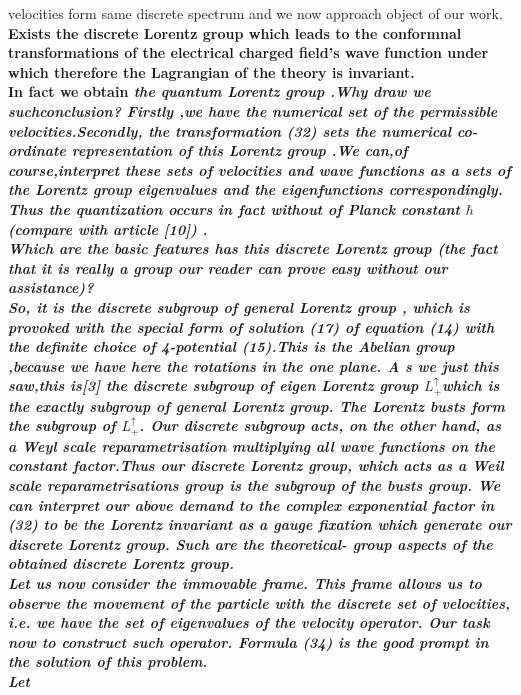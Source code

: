 \documentclass[a4paper,12pt] {article}
\begin{document}
{velocities form same discrete spectrum \rm and we now approach object of our work.\\ \bf Exists the
 discrete Lorentz group which leads to the conformnal transformations of the electrical charged field's
 wave function under which therefore the Lagrangian of the theory is invariant.
\\\rm  In fact we obtain \it the quantum Lorentz group .\rm Why draw we suchconclusion? Firstly ,we
 have the numerical set of the permissible velocities.Secondly, the transformation (32) sets
 \it the numerical co-ordinate representation of this Lorentz group  .\rm We can,of course,interpret these
sets of velocities and wave functions  \it as a sets of the Lorentz group  eigenvalues  and the
eigenfunctions  correspondingly. \rm Thus the quantization occurs \it in fact without of Planck
constant  $\hbar$\rm  (compare with article  [10]) .
\\Which are the basic features has this discrete Lorentz group (the fact that it is really a group our reader
 can   prove  easy without our assistance)?\\So, it is \it the discrete subgroup of general Lorentz group ,\rm
which is provoked with the special form of solution (17) of equation (14) with the definite choice of
4-potential (15).This is the \it  Abelian \rm group ,because we have here the rotations in  the one plane. A
s we just this saw,this is[3] \it the discrete subgroup of eigen Lorentz group $ L_+^\uparrow $\rm which is the \it exactly
\rm subgroup of general Lorentz group.
The  Lorentz busts form  the subgroup of   $ L_+^\uparrow$. Our discrete subgroup acts, on the other
 hand, as a \it  Weyl scale reparametrisation \rm multiplying
all wave functions on the constant factor.Thus \it our discrete Lorentz group, which acts as a Weil scale
 reparametrisations group is the subgroup of the busts group. \rm We can interpret our above demand to
 the complex exponential factor in (32)  to be the  Lorentz invariant as a \it gauge fixation which generate
 our discrete  Lorentz group.  \rm Such are the theoretical- group aspects of the obtained discrete
 Lorentz group.
\\ Let us now consider the immovable frame. This frame allows us to observe the movement of  the
 particle with the discrete
set of velocities, i.e. we have \it the set of  eigenvalues  of the velocity operator. \rm Our task now to
construct such operator. Formula (34) \it is the good prompt  in the solution of this problem. \\  \rm Let
}
\end{document}
